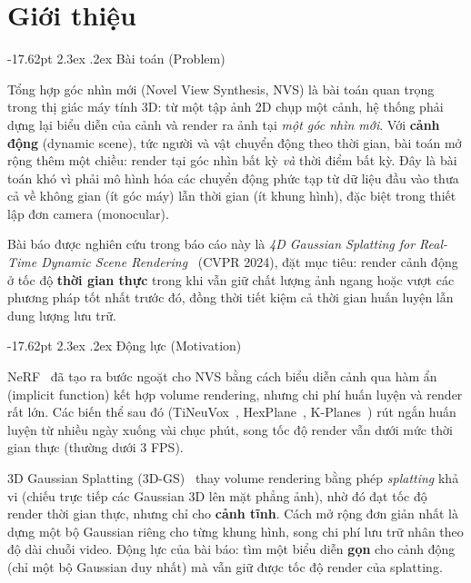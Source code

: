 \documentclass[a4paper]{report}
\makeatletter
\renewcommand\section{\@startsection{section}{1}{\z@}%
    {-17.62pt \@plus -5.89pt \@minus -1.18pt}%
    {2.3ex \@plus .2ex}%
    {\normalfont\fontsize{14.95pt}{16.31pt}\selectfont\bfseries}}
\makeatother
\begin{document}
\chapter{Giới thiệu}

\section{Bài toán (Problem)}

Tổng hợp góc nhìn mới (Novel View Synthesis, NVS) là bài toán quan trọng trong
thị giác máy tính 3D: từ một tập ảnh 2D chụp một cảnh, hệ thống phải dựng lại
biểu diễn của cảnh và render ra ảnh tại \textit{một góc nhìn mới}. Với
\textbf{cảnh động} (dynamic scene), tức người và vật chuyển động theo thời gian,
bài toán mở rộng thêm một chiều: render tại góc nhìn bất kỳ \textit{và} thời điểm
bất kỳ. Đây là bài toán khó vì phải mô hình hóa các chuyển động phức tạp từ dữ
liệu đầu vào thưa cả về không gian (ít góc máy) lẫn thời gian (ít khung hình),
đặc biệt trong thiết lập đơn camera (monocular).

Bài báo được nghiên cứu trong báo cáo này là \textit{4D Gaussian Splatting for
Real-Time Dynamic Scene Rendering}~\cite{wu20244dgs} (CVPR 2024), đặt mục tiêu:
render cảnh động ở tốc độ \textbf{thời gian thực} trong khi vẫn giữ chất lượng
ảnh ngang hoặc vượt các phương pháp tốt nhất trước đó, đồng thời tiết kiệm cả
thời gian huấn luyện lẫn dung lượng lưu trữ.

\section{Động lực (Motivation)}

NeRF~\cite{mildenhall2021nerf} đã tạo ra bước ngoặt cho NVS bằng cách biểu diễn
cảnh qua hàm ẩn (implicit function) kết hợp volume rendering, nhưng chi phí
huấn luyện và render rất lớn. Các biến thể sau đó (TiNeuVox~\cite{tineuvox},
HexPlane~\cite{hexplane}, K-Planes~\cite{kplanes}) rút ngắn huấn luyện từ nhiều
ngày xuống vài chục phút, song tốc độ render vẫn dưới mức thời gian thực
(thường dưới 3 FPS).

3D Gaussian Splatting (3D-GS)~\cite{3dgs} thay volume rendering bằng phép
\textit{splatting} khả vi (chiếu trực tiếp các Gaussian 3D lên mặt phẳng ảnh),
nhờ đó đạt tốc độ render thời gian thực, nhưng chỉ cho \textbf{cảnh tĩnh}. Cách mở rộng
đơn giản nhất là dựng một bộ Gaussian riêng cho từng khung hình, song chi phí lưu trữ
nhân theo độ dài chuỗi video. Động lực của bài báo: tìm một biểu diễn
\textbf{gọn} cho cảnh động (chỉ một bộ Gaussian duy nhất) mà vẫn giữ được
tốc độ render của splatting.
\end{document}
